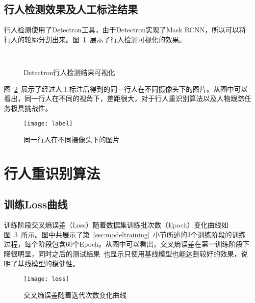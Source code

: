 \subsection{行人检测效果及人工标注结果}

行人检测使用了Detectron工具，由于Detectron实现了Mask RCNN，所以可以将行人的轮廓分割出来。图~\ref{fig:detectron}~展示了行人检测可视化的效果。

\begin{figure}[!ht]
\centering
\subfloat[场景1]{\centering\texttt{[image: 1-2\_5\_151]}}\quad
\subfloat[场景2]{\centering\texttt{[image: 3-7\_10\_394]}}\\
\quad
{}
\caption{Detectron行人检测结果可视化}
\label{fig:detectron}
\end{figure}

图~\ref{fig:label}~展示了经过人工标注后得到的同一行人在不同摄像头下的图片。从图中可以看出，同一行人在不同的视角下，差距很大，对于行人重识别算法以及人物跟踪任务极具挑战性。

\begin{figure}[!ht]
\centering
\texttt{[image: label]}
\caption{同一行人在不同摄像头下的图片}
\label{fig:label}
\end{figure}\vspace{-1em}

\section{行人重识别算法}

\subsection{训练Loss曲线}

训练阶段交叉熵误差（Loss）随着数据集训练批次数（Epoch）变化曲线如图~\ref{fig:loss}~所示。图中共展示了第~\ref{sec:modeltraining}~小节所述的3个训练阶段的训练过程，每个阶段包含60个Epoch。从图中可以看出，交叉熵误差在第一训练阶段下降很明显，同时之后的测试结果~\cite{sun2017beyond}也显示只使用基线模型也能达到较好的效果，说明了基线模型的稳健性。

\begin{figure}[!ht]
\centering
\texttt{[image: loss]}
\caption{交叉熵误差随着迭代次数变化曲线}
\label{fig:loss}
\end{figure}

